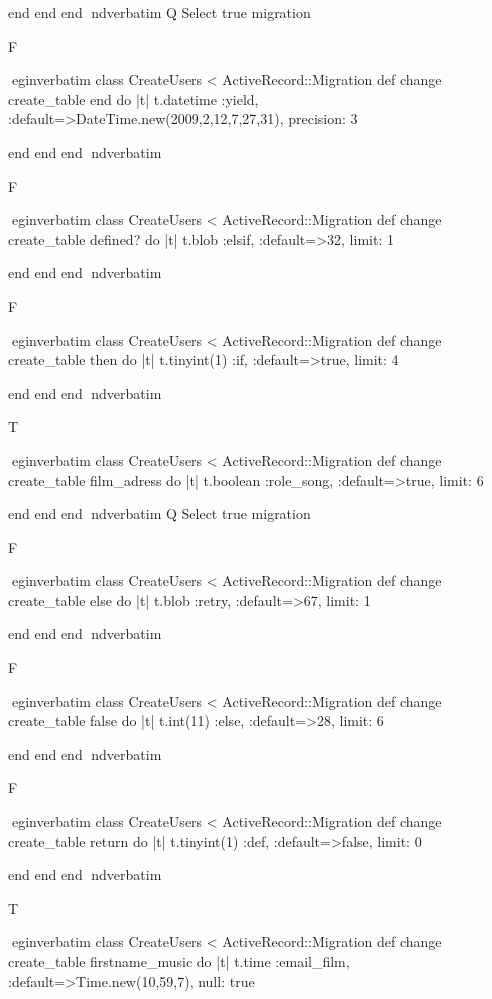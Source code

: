     end 
  end 
end
nd{verbatim}
Q
 Select true migration

F

egin{verbatim}
 class CreateUsers < ActiveRecord::Migration 
  def change 
    create_table end do |t| 
      t.datetime :yield, :default=>DateTime.new(2009,2,12,7,27,31), precision: 3
    
    end 
  end 
end
nd{verbatim}

F

egin{verbatim}
 class CreateUsers < ActiveRecord::Migration 
  def change 
    create_table defined? do |t| 
      t.blob :elsif, :default=>32, limit: 1
    
    end 
  end 
end
nd{verbatim}

F

egin{verbatim}
 class CreateUsers < ActiveRecord::Migration 
  def change 
    create_table then do |t| 
      t.tinyint(1) :if, :default=>true, limit: 4
    
    end 
  end 
end
nd{verbatim}

T

egin{verbatim}
 class CreateUsers < ActiveRecord::Migration 
  def change 
    create_table film_adress do |t| 
      t.boolean :role_song, :default=>true, limit: 6
    
    end 
  end 
end
nd{verbatim}
Q
 Select true migration

F

egin{verbatim}
 class CreateUsers < ActiveRecord::Migration 
  def change 
    create_table else do |t| 
      t.blob :retry, :default=>67, limit: 1
    
    end 
  end 
end
nd{verbatim}

F

egin{verbatim}
 class CreateUsers < ActiveRecord::Migration 
  def change 
    create_table false do |t| 
      t.int(11) :else, :default=>28, limit: 6
    
    end 
  end 
end
nd{verbatim}

F

egin{verbatim}
 class CreateUsers < ActiveRecord::Migration 
  def change 
    create_table return do |t| 
      t.tinyint(1) :def, :default=>false, limit: 0
    
    end 
  end 
end
nd{verbatim}

T

egin{verbatim}
 class CreateUsers < ActiveRecord::Migration 
  def change 
    create_table firstname_music do |t| 
      t.time :email_film, :default=>Time.new(10,59,7), null: true
    
